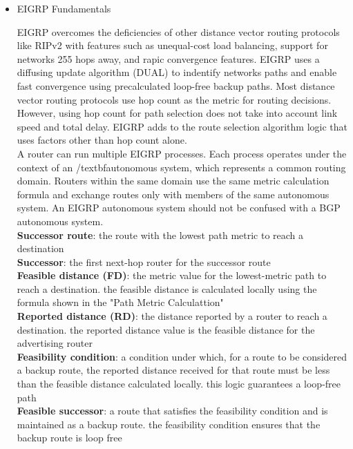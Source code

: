 \documentclass{article}
\begin{document}
\begin{itemize}
	\item EIGRP Fundamentals
		
		EIGRP overcomes the deficiencies of other distance vector routing protocols like RIPv2 with features such as unequal-cost load balancing, support for networks 255 hops away, and rapic convergence features. EIGRP uses a diffusing update algorithm (DUAL) to indentify networks paths and enable fast convergence using precalculated loop-free backup paths. Most distance vector routing protocols use hop count as the metric for routing decisions. However, using hop count for path selection does not take into account link speed and total delay. EIGRP adds to the route selection algorithm logic that uses factors other than hop count alone.\\

		A router can run multiple EIGRP processes. Each process operates under the context of an /textbf{autonomous system}, which represents a common routing domain. Routers within the same domain use the same metric calculation formula and exchange routes only with members of the same autonomous system. An EIGRP autonomous system should not be confused with a BGP autonomous system.\\

		\textbf{Successor route}: the route with the lowest path metric to reach a destination\\

		\textbf{Successor}: the first next-hop router for the successor route\\

		\textbf{Feasible distance (FD)}: the metric value for the lowest-metric path to reach a destination. the feasible distance is calculated locally using the formula shown in the "Path Metric Calculattion"\\

		\textbf{Reported distance (RD)}: the distance reported by a router to reach a destination. the reported distance value is the feasible distance for the advertising router\\

		\textbf{Feasibility condition}: a condition under which, for a route to be considered a backup route, the reported distance received for that route must be less than the feasible distance calculated locally. this logic guarantees a loop-free path\\

		\textbf{Feasible successor}: a route that satisfies the feasibility condition and is maintained as a backup route. the feasibility condition ensures that the backup route is loop free\\



\end{itemize}
\end{document}
